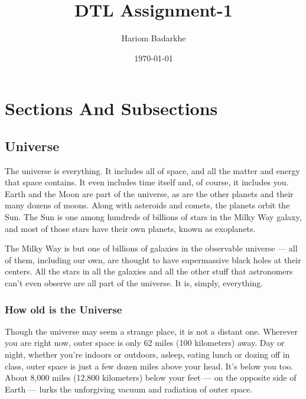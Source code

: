 \documentclass[12pt]{article}
\author{\large Hariom Badarkhe}
\date{\today}
\begin{document}
\raggedright
\title{\huge \bf DTL Assignment-1}
\maketitle
\newpage
{}
\section{\Huge Sections And Subsections}
\vspace{5mm}
\subsection{\large Universe}
The universe is everything. It includes all of space, and all the matter and energy that space contains. It even includes time itself and, of course, it includes you.
Earth and the Moon are part of the universe, as are the other planets and their many dozens of moons. Along with asteroids and comets, the planets orbit the Sun. The Sun is one among hundreds of billions of stars in the Milky Way galaxy, and most of those stars have their own planets, known as exoplanets.

The Milky Way is but one of billions of galaxies in the observable universe — all of them, including our own, are thought to have supermassive black holes at their centers. All the stars in all the galaxies and all the other stuff that astronomers can’t even observe are all part of the universe. It is, simply, everything.
\subsubsection{ How old is the Universe }
Though the universe may seem a strange place, it is not a distant one. Wherever you are right now, outer space is only 62 miles (100 kilometers) away. Day or night, whether you’re indoors or outdoors, asleep, eating lunch or dozing off in class, outer space is just a few dozen miles above your head. It’s below you too. About 8,000 miles (12,800 kilometers) below your feet — on the opposite side of Earth — lurks the unforgiving vacuum and radiation of outer space.
\end{document}
